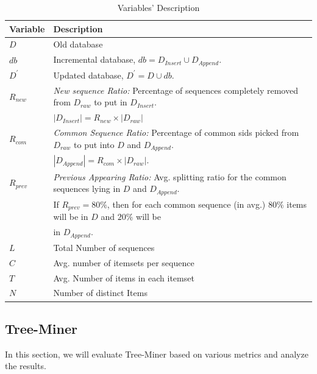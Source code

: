 \begin{table}[!t]
\centering
\begin{tabular}{|l|l|}
\hline
Variable & Description\\ \hline
$D$ & Old database \\ \hline
$db$ & Incremental database, $db=D_{Insert} \cup D_{Append}$. \\ \hline
$D^{\prime}$ & Updated database, $D^{\prime}=D \cup db$.\\ \hline
$R_{new}$ & \textit{New sequence Ratio: }Percentage of sequences completely removed from $D_{raw}$ to put in $D_{Insert}$.\\
&   $|D_{Insert}|=R_{new} \times |D_{raw}|$\\
\hline
$R_{com}$ & \textit{Common Sequence Ratio: }Percentage of common sids picked from $D_{raw}$ to put into $D$ and $D_{Append}$.  \\
& $|D_{Append}| = R_{com} \times |D_{raw}|$.\\
\hline
$R_{prev}$ & \textit{Previous Appearing Ratio: }Avg. splitting ratio for the common sequences lying in  $D$ and $D_{Append}$. \\
& If $R_{prev}=80\%$, then for each common sequence (in avg.) $80\%$ items will be in $D$ and $20\%$ will be \\
& in $D_{Append}$. \\
\hline
$L$ & Total Number of sequences\\ \hline
$C$ & Avg. number of itemsets per sequence \\ \hline
$T$ & Avg. Number of items in each itemset \\ \hline
$N$ & Number of distinct Items \\ \hline
\end{tabular}
\caption{Variables' Description}
\label{table:variables_description}
\end{table}




\subsection{Tree-Miner}
In this section, we will evaluate Tree-Miner based on various metrics and analyze the results.

